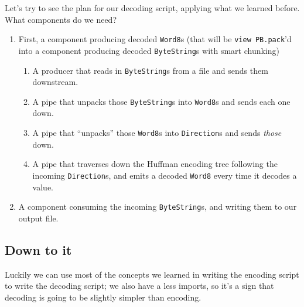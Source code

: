 \documentclass[]{article}
\begin{document}
Let's try to see the plan for our decoding script, applying what we learned
before. What components do we need?

\begin{enumerate}
\def\labelenumi{\arabic{enumi}.}
\tightlist
\item
  First, a component producing decoded \texttt{Word8}s (that will be
  \texttt{view\ PB.pack}'d into a component producing decoded
  \texttt{ByteString}s with smart chunking)

  \begin{enumerate}
  \def\labelenumii{\arabic{enumii}.}
  \tightlist
  \item
    A producer that reads in \texttt{ByteString}s from a file and sends them
    downstream.
  \item
    A pipe that unpacks those \texttt{ByteString}s into \texttt{Word8}s and
    sends each one down.
  \item
    A pipe that ``unpacks'' those \texttt{Word8}s into \texttt{Direction}s and
    sends \emph{those} down.
  \item
    A pipe that traverses down the Huffman encoding tree following the incoming
    \texttt{Direction}s, and emits a decoded \texttt{Word8} every time it
    decodes a value.
  \end{enumerate}
\item
  A component consuming the incoming \texttt{ByteString}s, and writing them to
  our output file.
\end{enumerate}

\subsection{Down to it}\label{down-to-it-1}

Luckily we can use most of the concepts we learned in writing the encoding
script to write the decoding script; we also have a less imports, so it's a sign
that decoding is going to be slightly simpler than encoding.
\end{document}
